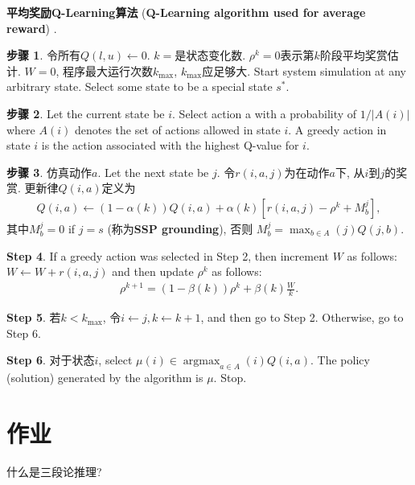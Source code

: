 \textbf{平均奖励Q-Learning算法} (\textbf{Q-Learning algorithm used for average reward}) \cite{gosavi2004reinforcement}.

\textbf{步骤 1}. 令所有$Q(l,u) \leftarrow 0$. $k=$是状态变化数. $\rho^k=0$表示第$k$阶段平均奖赏估计. $W=0$, 程序最大运行次数$k_{\max}$, $k_{\max}$应足够大. Start system simulation at any arbitrary state. Select some state to be a special state $s^{*}$.

\textbf{步骤 2}. Let the current state be $i$. Select action a with a probability of $1/|A (i)|$ where $A(i)$ denotes the set of
actions allowed in state $i$. A greedy action in state $i$ is the action associated with the highest Q-value for $i$.

\textbf{步骤 3}. 仿真动作$a$. Let the next state be $j$. 令$r(i, a, j)$为在动作$a$下, 从$i$到$j$的奖赏. 更新律$Q(i,a)$定义为
\begin{eqnarray}
  Q(i,a)\leftarrow (1-\alpha(k))Q(i,a)+\alpha(k)[r(i,a,j)-\rho^k+M_b^j],
\end{eqnarray}
其中$M_b^j= 0$ if $j = s$ (称为\textbf{SSP grounding}), 否则 $M^j_b= \max_{b\in A}(j)Q(j,b)$.

\textbf{Step 4}. If a greedy action was selected in Step 2, then increment $W$ as follows: $W \leftarrow W + r(i, a, j)$ and then update $\rho^k$ as follows:
\begin{eqnarray}
  \rho^{k+1}= (1 - \beta(k))\rho^k+ \beta(k)\frac{W}{k}.
\end{eqnarray}

\textbf{Step 5}. 若$k < k_{\max}$, 令$i \leftarrow j, k \leftarrow k + 1$, and then go to Step 2. Otherwise, go to Step 6.

\textbf{Step 6}. 对于状态$i$, select $\mu(i)\in  \mathop{\arg\max}_{a\in A }(i)Q(i, a)$. The policy (solution) generated by the algorithm is $\mu$. Stop.

\section{作业}

\begin{think}
 什么是三段论推理?
\end{think}

